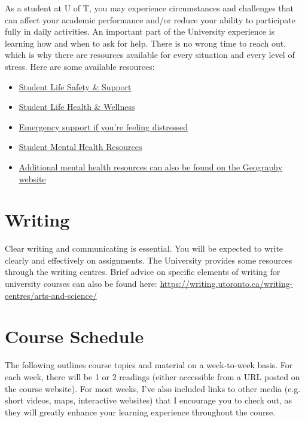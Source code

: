 \documentclass[11pt]{article}
\begin{document}
	As a student at U of T, you may experience circumstances and challenges that can affect your academic performance and/or reduce your ability to participate fully in daily activities. An important part of the University experience is learning how and when to ask for help. There is no wrong time to reach out, which is why there are resources available for every situation and every level of stress. Here are some available resources:
	
	\begin{itemize}
		
		
		\item \href{https://safety.utoronto.ca/}{Student Life Safety \& Support}
		\item \href{https://studentlife.utoronto.ca/department/health-wellness/}{Student Life Health \& Wellness}
		\item \href{https://studentlife.utoronto.ca/task/support-when-you-feel-distressed/}{Emergency support if you’re feeling distressed}
		
		\item \href{https://mentalhealth.utoronto.ca/}{Student Mental Health Resources}
		
		\item  \href{https://geography.utoronto.ca/department/mental-health-resources/}{Additional mental health resources can also be found on the Geography website}
	\end{itemize}

	
	\section*{Writing}
	
	Clear writing and communicating is essential. You will be expected to write clearly and effectively on
	assignments. The University provides some resources through the writing centres. Brief advice on
	specific elements of writing for university courses can also be found here:	
	\url{https://writing.utoronto.ca/writing-centres/arts-and-science/}
	



	
	\section*{Course Schedule}
	
	The following outlines course topics and material on a week-to-week basis. For each week, there will be 1 or 2  readings (either accessible from a URL posted on the course website). For most weeks, I've also included links to other media (e.g. short videos, maps, interactive websites) that I encourage you to check out, as they will greatly enhance your learning experience throughout the course.
\end{document}
